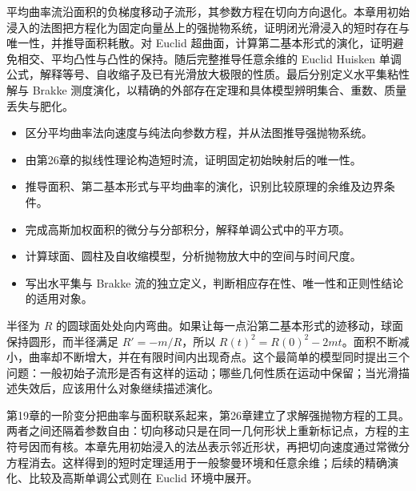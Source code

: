 
% 
% 


\begin{chapterabstract}
平均曲率流沿面积的负梯度移动子流形，其参数方程在切向方向退化。本章用初始浸入的法图把方程化为固定向量丛上的强抛物系统，证明闭光滑浸入的短时存在与唯一性，并推导面积耗散。对 Euclid 超曲面，计算第二基本形式的演化，证明避免相交、平均凸性与凸性的保持。随后完整推导任意余维的 Euclid Huisken 单调公式，解释等号、自收缩子及已有光滑放大极限的性质。最后分别定义水平集粘性解与 Brakke 测度演化，以精确的外部存在定理和具体模型辨明集合、重数、质量丢失与肥化。
\end{chapterabstract}

\begin{learninggoals}
	\begin{itemize}
		\item 区分平均曲率法向速度与纯法向参数方程，并从法图推导强抛物系统。
		\item 由第26章的拟线性理论构造短时流，证明固定初始映射后的唯一性。
		\item 推导面积、第二基本形式与平均曲率的演化，识别比较原理的余维及边界条件。
		\item 完成高斯加权面积的微分与分部积分，解释单调公式中的平方项。
		\item 计算球面、圆柱及自收缩模型，分析抛物放大中的空间与时间尺度。
		\item 写出水平集与 Brakke 流的独立定义，判断相应存在性、唯一性和正则性结论的适用对象。
	\end{itemize}
\end{learninggoals}

半径为 \(R\) 的圆球面处处向内弯曲。如果让每一点沿第二基本形式的迹移动，球面保持圆形，而半径满足 \(R'=-m/R\)，所以 \(R(t)^2=R(0)^2-2mt\)。面积不断减小，曲率却不断增大，并在有限时间内出现奇点。这个最简单的模型同时提出三个问题：一般初始子流形是否有这样的运动；哪些几何性质在运动中保留；当光滑描述失效后，应该用什么对象继续描述演化。

\ProseParagraphBreak
第19章的一阶变分把曲率与面积联系起来，第26章建立了求解强抛物方程的工具。两者之间还隔着参数自由：切向移动只是在同一几何形状上重新标记点，方程的主符号因而有核。本章先用初始浸入的法丛表示邻近形状，再把切向速度通过常微分方程消去。这样得到的短时定理适用于一般黎曼环境和任意余维；后续的精确演化、比较及高斯单调公式则在 Euclid 环境中展开。

